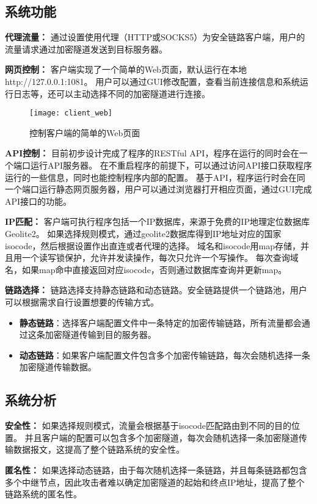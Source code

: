 \subsection{系统功能}
\textbf{代理流量：}
通过设置使用代理（HTTP或SOCKS5）为安全链路客户端，用户的流量请求通过加密隧道发送到目标服务器。

\textbf{网页控制：}
客户端实现了一个简单的Web页面，默认运行在本地http://127.0.0.1:1081。
用户可以通过GUI修改配置，查看当前连接信息和系统运行日志等，还可以主动选择不同的加密隧道进行连接。

\begin{figure}[H]
  \centering
  \texttt{[image: client\_web]}
  \caption{控制客户端的简单的Web页面}
\end{figure}

\textbf{API控制：}
目前初步设计完成了程序的RESTful API，程序在运行的同时会在一个端口运行API服务器。
在不重启程序的前提下，可以通过访问API接口获取程序运行的一些信息，同时也能控制程序内部的配置。
基于API，程序运行时会在同一个端口运行静态网页服务器，用户可以通过浏览器打开相应页面，通过GUI完成API接口的功能。

\textbf{IP匹配：}
客户端可执行程序包括一个IP数据库，来源于免费的IP地理定位数据库Geolite2。
如果选择规则模式，通过geolite2数据库得到IP地址对应的国家isocode，然后根据设置作出直连或者代理的选择。
域名和isocode用map存储，并且用一个读写锁保护，允许并发读操作，每次只允许一个写操作。
每次查询域名，如果map命中直接返回对应isocode，否则通过数据库查询并更新map。

\textbf{链路选择：}
链路选择支持静态链路和动态链路。安全链路提供一个链路池，用户可以根据需求自行设置想要的传输方式。
\begin{itemize}
  \item \textbf{静态链路}：选择客户端配置文件中一条特定的加密传输链路，所有流量都会通过这条加密隧道传输到目的服务器。
  \item \textbf{动态链路}：如果客户端配置文件包含多个加密传输链路，每次会随机选择一条加密隧道传输数据。
\end{itemize}

\subsection{系统分析}
\textbf{安全性：}
如果选择规则模式，流量会根据基于isocode匹配路由到不同的目的位置。
并且客户端的配置可以包含多个加密隧道，每次会随机选择一条加密隧道传输数据报文，这提高了整个链路系统的安全性。

\textbf{匿名性：}
如果选择动态链路，由于每次随机选择一条链路，并且每条链路都包含多个中继节点，因此攻击者难以确定加密隧道的起始和终点IP地址，提高了整个链路系统的匿名性。

